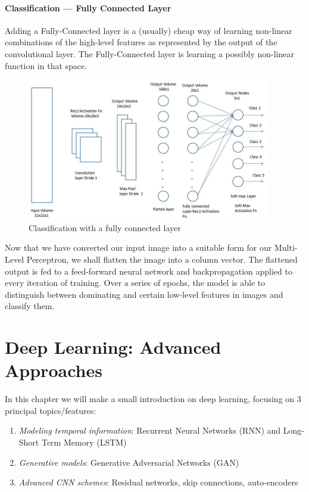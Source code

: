 \documentclass[12pt]{report}
\theoremstyle{plain}
\begin{document}
\begin{flushleft}
\subsubsection{Classification — Fully Connected Layer}
Adding a Fully-Connected layer is a (usually) cheap way of learning non-linear combinations of the high-level features as represented by the output of the convolutional layer. The Fully-Connected layer is learning a possibly non-linear function in that space.
\begin{figure}[!h]
	\centering
	\includegraphics[scale=1.2]{images/convNN_image_classification.pdf}
	\caption{Classification with a fully connected layer}
	\label{fig:convNN_image_classification}
\end{figure}
Now that we have converted our input image into a suitable form for our Multi-Level Perceptron, we shall flatten the image into a column vector. The flattened output is fed to a feed-forward neural network and backpropagation applied to every iteration of training. Over a series of epochs, the model is able to distinguish between dominating and certain low-level features in images and classify them.





\chapter{Deep Learning: Advanced Approaches}
In this chapter we will make a small introduction on deep learning, focusing on 3 principal topics/features:
\begin{enumerate}
	\item \textit{Modeling temporal information}: Recurrent	Neural Networks (RNN) and Long-Short Term	Memory (LSTM)
	\item \textit{Generative models}: Generative Adversarial Networks (GAN)
	\item \textit{Advanced CNN schemes}: Residual networks, skip	connections, auto-encoders
\end{enumerate}


\end{flushleft}
\end{document}

